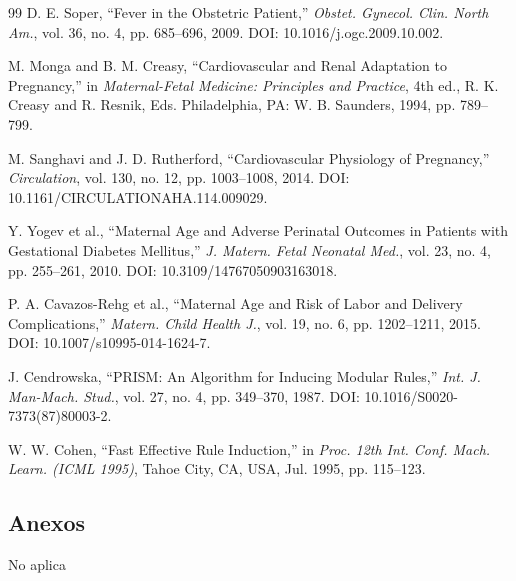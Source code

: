 \documentclass[11pt]{article}
\begin{document}
{\begin{thebibliography}{99}
D. E. Soper, ``Fever in the Obstetric Patient,'' \textit{Obstet. Gynecol. Clin. North Am.}, vol. 36, no. 4, pp. 685--696, 2009. DOI: 10.1016/j.ogc.2009.10.002.

M. Monga and B. M. Creasy, ``Cardiovascular and Renal Adaptation to Pregnancy,'' in \textit{Maternal-Fetal Medicine: Principles and Practice}, 4th ed., R. K. Creasy and R. Resnik, Eds. Philadelphia, PA: W. B. Saunders, 1994, pp. 789--799.

M. Sanghavi and J. D. Rutherford, ``Cardiovascular Physiology of Pregnancy,'' \textit{Circulation}, vol. 130, no. 12, pp. 1003--1008, 2014. DOI: 10.1161/CIRCULATIONAHA.114.009029.

Y. Yogev et al., ``Maternal Age and Adverse Perinatal Outcomes in Patients with Gestational Diabetes Mellitus,'' \textit{J. Matern. Fetal Neonatal Med.}, vol. 23, no. 4, pp. 255--261, 2010. DOI: 10.3109/14767050903163018.

P. A. Cavazos-Rehg et al., ``Maternal Age and Risk of Labor and Delivery Complications,'' \textit{Matern. Child Health J.}, vol. 19, no. 6, pp. 1202--1211, 2015. DOI: 10.1007/s10995-014-1624-7.

J. Cendrowska, ``PRISM: An Algorithm for Inducing Modular Rules,'' \textit{Int. J. Man-Mach. Stud.}, vol. 27, no. 4, pp. 349--370, 1987. DOI: 10.1016/S0020-7373(87)80003-2.

W. W. Cohen, ``Fast Effective Rule Induction,'' in \textit{Proc. 12th Int. Conf. Mach. Learn. (ICML 1995)}, Tahoe City, CA, USA, Jul. 1995, pp. 115--123.


\end{thebibliography}
}



\subsection{Anexos}
No aplica
\end{document}
